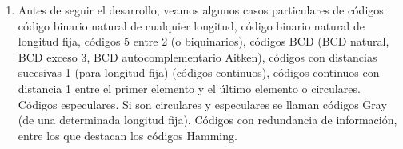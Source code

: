 \documentclass[
]{article}
\begin{document}
\begin{enumerate}
\begin{enumerate}
    ``cig\#ueña'', y si lleva una til\-de como en Julián como
    ``Juli\textasciitilde an''. Un nombre más habitual que el de
    lenguaje en electrónica suele ser el de código.
  \item
    Antes de seguir el desarrollo, veamos algunos casos particulares de
    códigos: código binario natural de cualquier longitud, código
    binario natural de longitud fija, códigos 5 entre 2 (o biquinarios),
    códigos BCD (BCD natural, BCD exceso 3, BCD autocom\-plementario
    Aitken), códigos con distancias sucesivas 1 (para longitud fija)
    (códigos continuos), códigos continuos con distancia 1 entre el
    primer elemento y el último elemento o circulares. Códigos
    especulares. Si son circulares y especulares se llaman códigos Gray
    (de una determinada longitud fija). Códigos con redundancia de
    infor\-mación, entre los que destacan los códigos Hamming.


\end{enumerate}
\end{enumerate}
\end{document}
